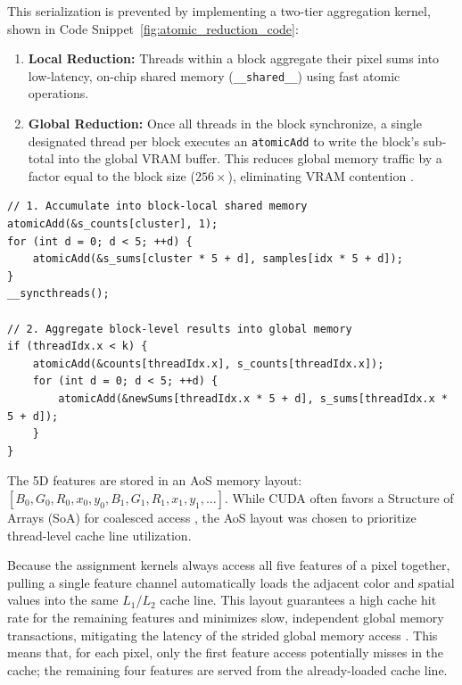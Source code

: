 This serialization is prevented by implementing a two-tier aggregation kernel, shown in Code Snippet~\ref{fig:atomic_reduction_code}:
\begin{enumerate}
    \item \textbf{Local Reduction:} Threads within a block aggregate their pixel sums into low-latency, on-chip shared memory (\texttt{\_\_shared\_\_}) using fast atomic operations.
    \item \textbf{Global Reduction:} Once all threads in the block synchronize, a single designated thread per block executes an \texttt{atomicAdd} to write the block's sub-total into the global VRAM buffer. This reduces global memory traffic by a factor equal to the block size ($256\times$), eliminating VRAM contention \cite{CudaGuide, cook2012cuda}.
\end{enumerate}

\begin{lstlisting}[float=htbp, caption={Two-tier local-to-global atomic reduction in \texttt{base\_kmeans\_\allowbreak engine.cu} (lines 79-99).}, label={fig:atomic_reduction_code}]
// 1. Accumulate into block-local shared memory
atomicAdd(&s_counts[cluster], 1);
for (int d = 0; d < 5; ++d) {
    atomicAdd(&s_sums[cluster * 5 + d], samples[idx * 5 + d]);
}
__syncthreads();

// 2. Aggregate block-level results into global memory
if (threadIdx.x < k) {
    atomicAdd(&counts[threadIdx.x], s_counts[threadIdx.x]);
    for (int d = 0; d < 5; ++d) {
        atomicAdd(&newSums[threadIdx.x * 5 + d], s_sums[threadIdx.x * 5 + d]);
    }
}
\end{lstlisting}

The 5D features are stored in an AoS memory layout: $[B_0, G_0, R_0, x_0, y_0, \allowbreak B_1, G_1, R_1, x_1, y_1, \dots]$. While CUDA often favors a Structure of Arrays (SoA) for coalesced access \cite{CudaGuide, cook2012cuda}, the AoS layout was chosen to prioritize thread-level cache line utilization. 

Because the assignment kernels always access all five features of a pixel together, pulling a single feature channel automatically loads the adjacent color and spatial values into the same $L_1$/$L_2$ cache line. This layout guarantees a high cache hit rate for the remaining features and minimizes slow, independent global memory transactions, mitigating the latency of the strided global memory access \cite{CudaGuide}. This means that, for each pixel, only the first feature access potentially misses in the cache; the remaining four features are served from the already-loaded cache line.


